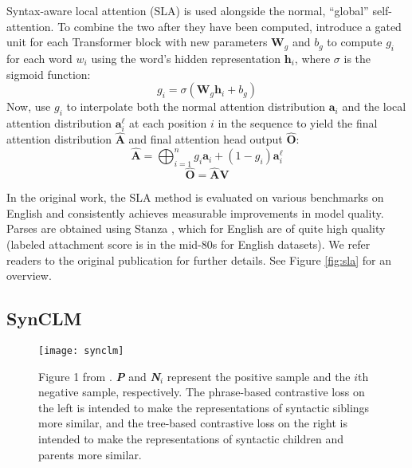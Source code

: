 \documentclass[11pt]{article}
\begin{document}
Syntax-aware local attention (SLA) is used alongside the normal, ``global'' self-attention.
To combine the two after they have been computed, introduce a gated unit for each Transformer block with new parameters $\mathbf{W}_g$ and $b_g$ to compute $g_i$ for each word $w_i$ using the word's hidden representation $\mathbf{h}_i$, where $\sigma$ is the sigmoid function:
\begin{equation}
    g_i = \sigma(\mathbf{W}_g\mathbf{h}_i + b_g)
\end{equation}
Now, use $g_i$ to interpolate both the normal attention distribution $\mathbf{a}_i$ and the local attention distribution $\mathbf{a}^\ell_i$ at each position $i$ in the sequence to yield the final attention distribution $\mathbf{\hat{A}}$ and final attention head output $\mathbf{\hat{O}}$:
\begin{equation}
    \mathbf{\hat{A}} = \bigoplus_{i=1}^n g_i\mathbf{a}_i + (1 - g_i)\mathbf{a}^\ell_i
\end{equation}
\begin{equation}
    \mathbf{\hat{O}} = \mathbf{\hat{A}}\mathbf{V}
\end{equation}

In the original work, the SLA method is evaluated on various benchmarks on English and consistently achieves measurable improvements in model quality.
Parses are obtained using Stanza \citep{qi-etal-2020-stanza}, which %
for English are of quite high quality (labeled attachment score is in the mid-80s for English datasets).
We refer readers to the original publication for further details.
See Figure \ref{fig:sla} for an overview.

\subsection{SynCLM}
\begin{figure*}
    \centering
    \texttt{[image: synclm]}
    \caption{Figure 1 from \citet{zhang-etal-2022-syntax}. \textbf{\textit{P}} and \textbf{\textit{N}}$_i$ represent the positive sample and the $i$th negative sample, respectively. The phrase-based contrastive loss on the left is intended to make the representations of syntactic siblings more similar, and the tree-based contrastive loss on the right is intended to make the representations of syntactic children and parents more similar.}
    \label{fig:synclm}
\end{figure*}
\end{document}
